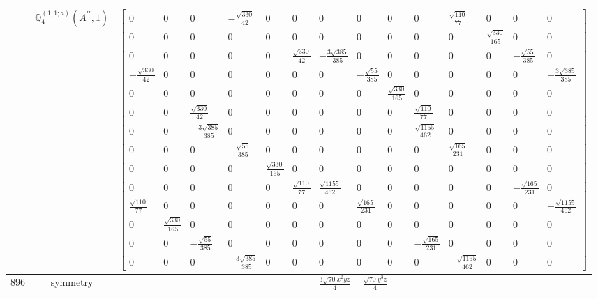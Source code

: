 \documentclass[fleqn,8pt,landscape]{jsarticle}
\begin{document}
\begin{longtable}{ccc}
$  $ & $ \mathbb{Q}_{4}^{(1,1;a)}(A^{\prime\prime},1) $ & $ \begin{bmatrix} 0 & 0 & 0 & - \frac{\sqrt{330}}{42} & 0 & 0 & 0 & 0 & 0 & 0 & \frac{\sqrt{110}}{77} & 0 & 0 & 0 \\ 0 & 0 & 0 & 0 & 0 & 0 & 0 & 0 & 0 & 0 & 0 & \frac{\sqrt{330}}{165} & 0 & 0 \\ 0 & 0 & 0 & 0 & 0 & \frac{\sqrt{330}}{42} & - \frac{3 \sqrt{385}}{385} & 0 & 0 & 0 & 0 & 0 & - \frac{\sqrt{55}}{385} & 0 \\ - \frac{\sqrt{330}}{42} & 0 & 0 & 0 & 0 & 0 & 0 & - \frac{\sqrt{55}}{385} & 0 & 0 & 0 & 0 & 0 & - \frac{3 \sqrt{385}}{385} \\ 0 & 0 & 0 & 0 & 0 & 0 & 0 & 0 & \frac{\sqrt{330}}{165} & 0 & 0 & 0 & 0 & 0 \\ 0 & 0 & \frac{\sqrt{330}}{42} & 0 & 0 & 0 & 0 & 0 & 0 & \frac{\sqrt{110}}{77} & 0 & 0 & 0 & 0 \\ 0 & 0 & - \frac{3 \sqrt{385}}{385} & 0 & 0 & 0 & 0 & 0 & 0 & \frac{\sqrt{1155}}{462} & 0 & 0 & 0 & 0 \\ 0 & 0 & 0 & - \frac{\sqrt{55}}{385} & 0 & 0 & 0 & 0 & 0 & 0 & \frac{\sqrt{165}}{231} & 0 & 0 & 0 \\ 0 & 0 & 0 & 0 & \frac{\sqrt{330}}{165} & 0 & 0 & 0 & 0 & 0 & 0 & 0 & 0 & 0 \\ 0 & 0 & 0 & 0 & 0 & \frac{\sqrt{110}}{77} & \frac{\sqrt{1155}}{462} & 0 & 0 & 0 & 0 & 0 & - \frac{\sqrt{165}}{231} & 0 \\ \frac{\sqrt{110}}{77} & 0 & 0 & 0 & 0 & 0 & 0 & \frac{\sqrt{165}}{231} & 0 & 0 & 0 & 0 & 0 & - \frac{\sqrt{1155}}{462} \\ 0 & \frac{\sqrt{330}}{165} & 0 & 0 & 0 & 0 & 0 & 0 & 0 & 0 & 0 & 0 & 0 & 0 \\ 0 & 0 & - \frac{\sqrt{55}}{385} & 0 & 0 & 0 & 0 & 0 & 0 & - \frac{\sqrt{165}}{231} & 0 & 0 & 0 & 0 \\ 0 & 0 & 0 & - \frac{3 \sqrt{385}}{385} & 0 & 0 & 0 & 0 & 0 & 0 & - \frac{\sqrt{1155}}{462} & 0 & 0 & 0 \end{bmatrix} $ \\ \hline
$ 896 $ & $ \text{symmetry} $ & $ \frac{3 \sqrt{70} x^{2} y z}{4} - \frac{\sqrt{70} y^{3} z}{4} $ \\

\end{longtable}
\end{document}
